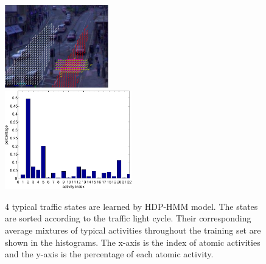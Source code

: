 \begin{figure}[!htp]
{		\begin{minipage}{0.45\linewidth}
			\centering\includegraphics[width = 4.5cm]{figures/qmul_2/s2-crop.pdf}\\
			\vfill
			\centering\includegraphics[width = 5.5cm]{figures/qmul_2/s2_hist-crop.pdf}
		\end{minipage}
		\label{fig:subfigure:qmul2state3}
	}
	\hfill
	\caption[Typical traffic states in QMUL Junction Dataset 2]{4 typical traffic states are learned by HDP-HMM model. The states are sorted according to the traffic light cycle. Their corresponding average mixtures of typical activities throughout the training set are shown in the histograms. The x-axis is the index of atomic activities and the y-axis is the percentage of each atomic activity.}
	\label{qmul2_state}
\end{figure}

